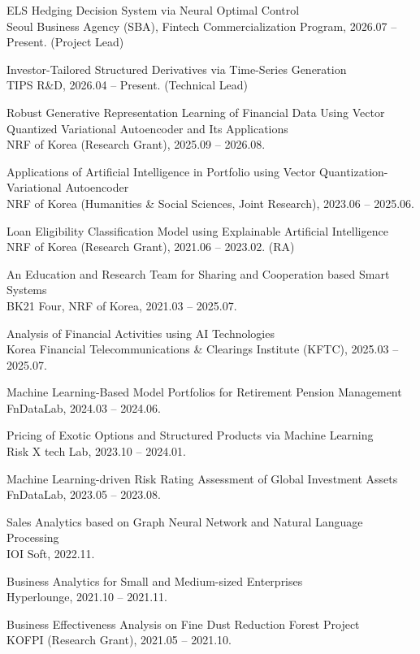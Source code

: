 \documentclass[11pt]{article}
\begin{document}
\begin{nlist}
\item[{[6]}] ELS Hedging Decision System via Neural Optimal Control\\ Seoul Business Agency (SBA), Fintech Commercialization Program, 2026.07 – Present. (Project Lead)
\item[{[5]}] Investor-Tailored Structured Derivatives via Time-Series Generation\\ TIPS R\&D, 2026.04 – Present. (Technical Lead)
\item[{[4]}] Robust Generative Representation Learning of Financial Data Using Vector Quantized Variational Autoencoder and Its Applications\\ NRF of Korea (Research Grant), 2025.09 – 2026.08.
\item[{[3]}] Applications of Artificial Intelligence in Portfolio using Vector Quantization-Variational Autoencoder\\ NRF of Korea (Humanities \& Social Sciences, Joint Research), 2023.06 – 2025.06.
\item[{[2]}] Loan Eligibility Classification Model using Explainable Artificial Intelligence\\ NRF of Korea (Research Grant), 2021.06 – 2023.02. (RA)
\item[{[1]}] An Education and Research Team for Sharing and Cooperation based Smart Systems\\ BK21 Four, NRF of Korea, 2021.03 – 2025.07.
\end{nlist}
\begin{nlist}
\item[{[7]}] Analysis of Financial Activities using AI Technologies\\ Korea Financial Telecommunications \& Clearings Institute (KFTC), 2025.03 – 2025.07.
\item[{[6]}] Machine Learning-Based Model Portfolios for Retirement Pension Management\\ FnDataLab, 2024.03 – 2024.06.
\item[{[5]}] Pricing of Exotic Options and Structured Products via Machine Learning\\ Risk X tech Lab, 2023.10 – 2024.01.
\item[{[4]}] Machine Learning-driven Risk Rating Assessment of Global Investment Assets\\ FnDataLab, 2023.05 – 2023.08.
\item[{[3]}] Sales Analytics based on Graph Neural Network and Natural Language Processing\\ IOI Soft, 2022.11.
\item[{[2]}] Business Analytics for Small and Medium-sized Enterprises\\ Hyperlounge, 2021.10 – 2021.11.
\item[{[1]}] Business Effectiveness Analysis on Fine Dust Reduction Forest Project\\ KOFPI (Research Grant), 2021.05 – 2021.10.
\end{nlist}
\end{document}
